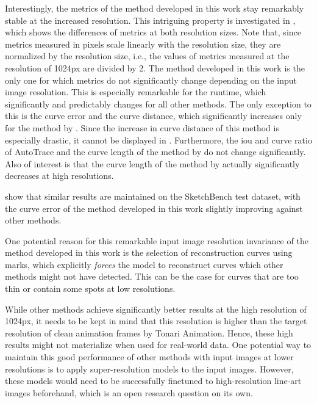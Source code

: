 Interestingly, the metrics of the method developed in this work stay remarkably stable at the increased resolution. This intriguing property is investigated in , which shows the differences of metrics at both resolution sizes. Note that, since metrics measured in pixels scale linearly with the resolution size, they are normalized by the resolution size, i.e., the values of metrics measured at the resolution of 1024px are divided by 2. The method developed in this work is the only one for which metrics do not significantly change depending on the input image resolution. This is especially remarkable for the runtime, which significantly and predictably changes for all other methods. The only exception to this is the curve error and the curve distance, which significantly increases only for the method by \citet{Puhachov2021KeypointPolyvector}. Since the increase in curve distance of this method is especially drastic, it cannot be displayed in . Furthermore, the \gls{iou} and curve ratio of AutoTrace \citep{autotrace} and the curve length of the method by \citet{DBLP:conf/eccv/EgiazarianVAVST20} do not change significantly. Also of interest is that the curve length of the method by \citet{mo2021virtualsketching} actually significantly decreases at high resolutions.

 show that similar results are maintained on the SketchBench test dataset, with the curve error of the method developed in this work slightly improving against other methods.

One potential reason for this remarkable input image resolution invariance of the method developed in this work is the selection of reconstruction curves using marks, which explicitly \emph{forces} the model to reconstruct curves which other methods might not have detected. This can be the case for curves that are too thin or contain some spots at low resolutions.

While other methods achieve significantly better results at the high resolution of 1024px, it needs to be kept in mind that this resolution is higher than the target resolution of clean animation frames by Tonari Animation. Hence, these high results might not materialize when used for real-world data. One potential way to maintain this good performance of other methods with input images at lower resolutions is to apply super-resolution models \citep{DBLP:journals/pami/DongLHT16} to the input images. However, these models would need to be successfully finetuned to high-resolution line-art images beforehand, which is an open research question on its own.

